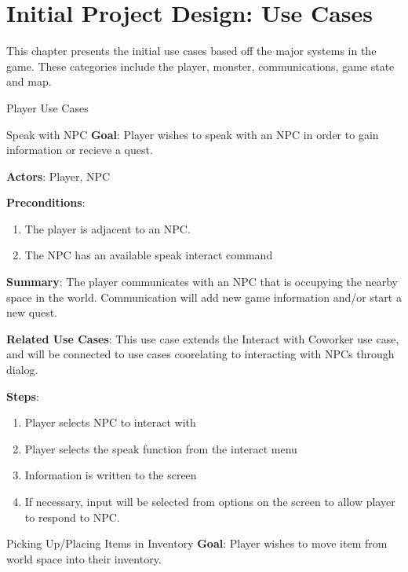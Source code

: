 \documentclass[12pt]{report}
\begin{document}
\chapter{Initial Project Design: Use Cases}
This chapter presents the initial use cases based off the major systems in the game. These categories
include the player, monster, communications, game state and map.
  
  \begin{section}{Player Use Cases}
    \begin{subsection}{Speak with NPC}
      \textbf{Goal}:
      Player wishes to speak with an NPC in order to gain information or recieve 
      a quest.
      
      \textbf{Actors}:
      Player, NPC

      \textbf{Preconditions}:
      \begin{enumerate}
        \item The player is adjacent to an NPC.
        \item The NPC has an available speak interact command
      \end{enumerate}

      \textbf{Summary}:
      The player communicates with an NPC that is occupying the nearby space 
      in the world. Communication will add new game information and/or start
      a new quest.

      \textbf{Related Use Cases}:
      This use case extends the Interact with Coworker use case, and will be 
      connected to use cases coorelating to interacting with NPCs through 
      dialog.

      \textbf{Steps}:
      \begin{enumerate}
        \item Player selects NPC to interact with
        \item Player selects the speak function from the interact menu
        \item Information is written to the screen
        \item If necessary, input will be selected from options on the screen
	      to allow player to respond to NPC.
      \end{enumerate}
    \end{subsection}



    \begin{subsection}{Picking Up/Placing Items in Inventory}
       \textbf{Goal}:
      Player wishes to move item from world space into their inventory.
      

\end{subsection}
\end{section}
\end{document}
